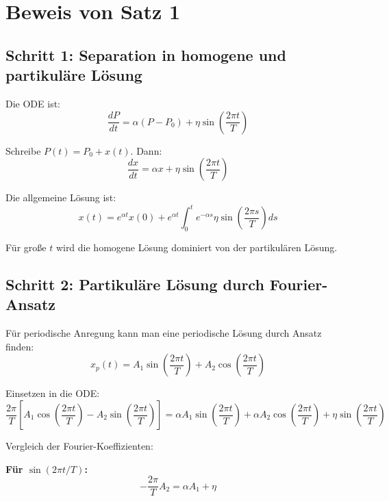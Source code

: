\documentclass[a4paper,11pt]{report}
\theoremstyle{definition}
\begin{document}
\section{Beweis von Satz 1}

\subsection{Schritt 1: Separation in homogene und partikuläre Lösung}

Die ODE ist:
\begin{equation}
    \frac{dP}{dt} = \alpha(P - P_0) + \eta \sin\left(\frac{2\pi t}{T}\right)
\end{equation}

Schreibe $P(t) = P_0 + x(t)$. Dann:
\begin{equation}
    \frac{dx}{dt} = \alpha x + \eta \sin\left(\frac{2\pi t}{T}\right)
\end{equation}

Die allgemeine Lösung ist:
\begin{equation}
    x(t) = e^{\alpha t} x(0) + e^{\alpha t} \int_0^t e^{-\alpha s} \eta \sin\left(\frac{2\pi s}{T}\right) ds
\end{equation}

Für große $t$ wird die homogene Lösung dominiert von der partikulären Lösung.

\subsection{Schritt 2: Partikuläre Lösung durch Fourier-Ansatz}

Für periodische Anregung kann man eine periodische Lösung durch Ansatz finden:
\begin{equation}
    x_p(t) = A_1 \sin\left(\frac{2\pi t}{T}\right) + A_2 \cos\left(\frac{2\pi t}{T}\right)
\end{equation}

Einsetzen in die ODE:
\begin{equation}
    \frac{2\pi}{T} \left[A_1 \cos\left(\frac{2\pi t}{T}\right) - A_2 \sin\left(\frac{2\pi t}{T}\right)\right] = \alpha A_1 \sin\left(\frac{2\pi t}{T}\right) + \alpha A_2 \cos\left(\frac{2\pi t}{T}\right) + \eta \sin\left(\frac{2\pi t}{T}\right)
\end{equation}

Vergleich der Fourier-Koeffizienten:

\textbf{Für $\sin(2\pi t / T)$:}
\begin{equation}
    -\frac{2\pi}{T} A_2 = \alpha A_1 + \eta
\end{equation}
\end{document}
